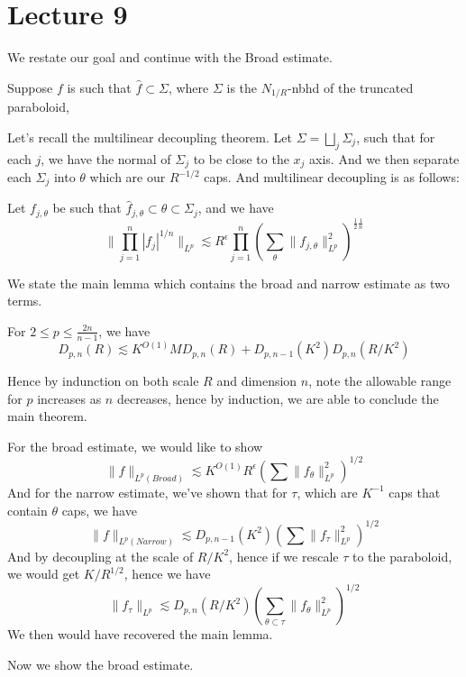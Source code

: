 \section{Lecture 9}

We restate our goal and continue with the Broad estimate.
\begin{theorem}
    Suppose $f$ is such that $\widehat{f}\subset\Sigma$, where $\Sigma$ is the $N_{1/R}$-nbhd of the truncated paraboloid, 
\end{theorem}
Let's recall the multilinear decoupling theorem. Let $\Sigma=\bigsqcup_j\Sigma_j$, such that for each $j$, we have the normal of $\Sigma_j$ to be close to the $x_j$ axis. And we then separate each $\Sigma_j$ into $\theta$ which are our $R^{-1/2}$ caps. And multilinear decoupling is as follows:
\begin{theorem}
    Let $f_{j,\theta}$ be such that $\widehat{f}_{j,\theta}\subset\theta\subset\Sigma_j$, and we have
    \begin{equation*}
        \|\prod_{j=1}^n|f_j|^{1/n}\|_{L^p}\lesssim R^\epsilon\prod_{j=1}^n\left(\sum_{\theta}\|f_{j,\theta}\|_{L^p}^2 \right)^{\frac{1}{2}\frac{1}{n}}
    \end{equation*}
\end{theorem}

We state the main lemma which contains the broad and narrow estimate as two terms.
\begin{lemma}[Main]
    For $2\leq p\leq\frac{2n}{n-1}$, we have
    \begin{equation*}
        D_{p,n}(R)\lesssim K^{O(1)}MD_{p,n}(R)+D_{p,n-1}(K^2)D_{p,n}(R/K^2)
    \end{equation*}
\end{lemma}
Hence by indunction on both scale $R$ and dimension $n$, note the allowable range for $p$ increases as $n$ decreases, hence by induction, we are able to conclude the main theorem.

For the broad estimate, we would like to show
\begin{equation*}
    \|f\|_{L^p(Broad)}\lesssim K^{O(1)}R^\epsilon\left(\sum\|f_\theta\|_{L^p}^2 \right)^{1/2}
\end{equation*}
And for the narrow estimate, we've shown that for $\tau$, which are $K^{-1}$ caps that contain $\theta$ caps, we have
\begin{equation*}
    \|f\|_{L^p(Narrow)}\lesssim D_{p,n-1}(K^2)\left(\sum\|f_\tau\|_{L^p}^2 \right)^{1/2}
\end{equation*}
And by decoupling at the scale of $R/K^2$, hence if we rescale $\tau$ to the paraboloid, we would get $K/R^{1/2}$, hence we have
\begin{equation*}
    \|f_\tau\|_{L^p}\lesssim D_{p,n}(R/K^2)\left(\sum_{\theta\subset\tau}\|f_\theta\|_{L^p}^2 \right)^{1/2}
\end{equation*}
We then would have recovered the main lemma.

Now we show the broad estimate.

